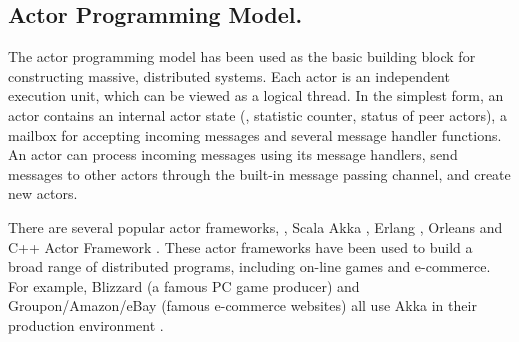 




\subsection{Actor Programming Model.}

The actor programming model has been used as the basic building block for constructing massive, distributed systems\cite{actor-wiki, akka, newell2016optimizing}. Each actor is an independent execution unit, which can be viewed as a logical thread. In the simplest form, an actor contains an internal actor state (\eg, statistic counter, status of peer actors), a mailbox for accepting incoming messages and several message handler functions. An actor can process incoming messages using its message handlers, send messages to other actors through the built-in message passing channel, and create new actors.

There are several popular actor frameworks, \ie, Scala Akka \cite{akka}, Erlang \cite{erlang}, Orleans \cite{Orleans} and C++ Actor Framework \cite{caf}. These actor frameworks have been used to build a broad range of distributed programs, including on-line games and e-commerce. For example, Blizzard (a famous PC game producer) and Groupon/Amazon/eBay (famous e-commerce websites) all use Akka in their production environment \cite{akka}.


